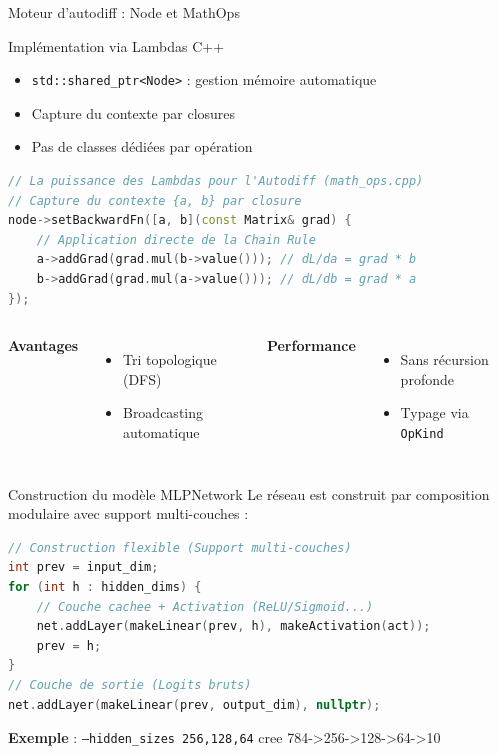 \documentclass[aspectratio=169,xcolor=dvipsnames]{beamer}
\begin{document}
\begin{frame}[fragile]{Moteur d'autodiff : Node et MathOps}
\begin{block}{Implémentation via Lambdas C++}
\begin{itemize}
    \item \texttt{std::shared\_ptr<Node>} : gestion mémoire automatique
    \item Capture du contexte par closures
    \item Pas de classes dédiées par opération
\end{itemize}
\end{block}

\begin{lstlisting}[language=C++]
// La puissance des Lambdas pour l'Autodiff (math_ops.cpp)
// Capture du contexte {a, b} par closure
node->setBackwardFn([a, b](const Matrix& grad) {
    // Application directe de la Chain Rule
    a->addGrad(grad.mul(b->value())); // dL/da = grad * b
    b->addGrad(grad.mul(a->value())); // dL/db = grad * a
});
\end{lstlisting}

{\small
\begin{columns}[T]
\textbf{Avantages}
\begin{itemize}
    \item Tri topologique (DFS)
    \item Broadcasting automatique
\end{itemize}

\textbf{Performance}
\begin{itemize}
    \item Sans récursion profonde
    \item Typage via \texttt{OpKind}
\end{itemize}
\end{columns}
}
\end{frame}

\begin{frame}[fragile]{Construction du modèle MLPNetwork}
{\small
Le réseau est construit par composition modulaire avec support multi-couches :
}

\begin{lstlisting}[language=C++]
// Construction flexible (Support multi-couches)
int prev = input_dim;
for (int h : hidden_dims) {
    // Couche cachee + Activation (ReLU/Sigmoid...)
    net.addLayer(makeLinear(prev, h), makeActivation(act));
    prev = h;
}
// Couche de sortie (Logits bruts)
net.addLayer(makeLinear(prev, output_dim), nullptr);
\end{lstlisting}

{\small
\textbf{Exemple} : \texttt{--hidden\_sizes 256,128,64} cree 784->256->128->64->10
}
\end{frame}
\end{document}
